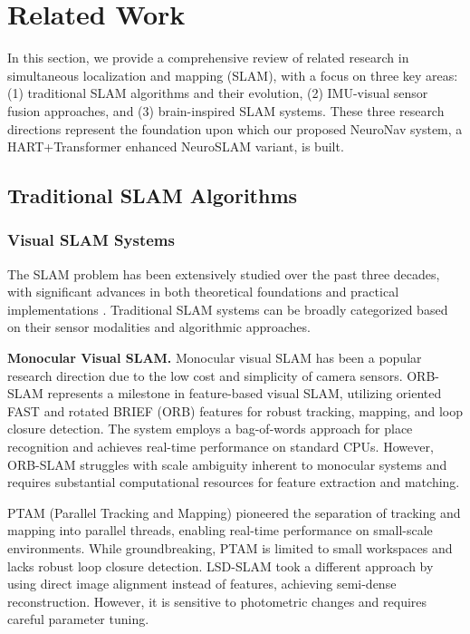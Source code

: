 \section{Related Work}

In this section, we provide a comprehensive review of related research in simultaneous localization and mapping (SLAM), with a focus on three key areas: (1) traditional SLAM algorithms and their evolution, (2) IMU-visual sensor fusion approaches, and (3) brain-inspired SLAM systems. These three research directions represent the foundation upon which our proposed NeuroNav system, a HART+Transformer enhanced NeuroSLAM variant, is built.

\subsection{Traditional SLAM Algorithms}

\subsubsection{Visual SLAM Systems}

The SLAM problem has been extensively studied over the past three decades, with significant advances in both theoretical foundations and practical implementations \cite{Cadena2016}. Traditional SLAM systems can be broadly categorized based on their sensor modalities and algorithmic approaches.

\textbf{Monocular Visual SLAM.} 
Monocular visual SLAM has been a popular research direction due to the low cost and simplicity of camera sensors. 
ORB-SLAM \cite{MurArtal2015, MurArtal2017} represents a milestone in feature-based visual SLAM, utilizing oriented FAST and rotated BRIEF (ORB) features for robust tracking, mapping, and loop closure detection. 
The system employs a bag-of-words approach for place recognition and achieves real-time performance on standard CPUs. 
However, ORB-SLAM struggles with scale ambiguity inherent to monocular systems and requires substantial computational resources for feature extraction and matching.

PTAM (Parallel Tracking and Mapping) \cite{Klein2007} pioneered the separation of tracking and mapping into parallel threads, enabling real-time performance on small-scale environments. 
While groundbreaking, PTAM is limited to small workspaces and lacks robust loop closure detection.
LSD-SLAM \cite{Engel2014} took a different approach by using direct image alignment instead of features, achieving semi-dense reconstruction. 
However, it is sensitive to photometric changes and requires careful parameter tuning.

